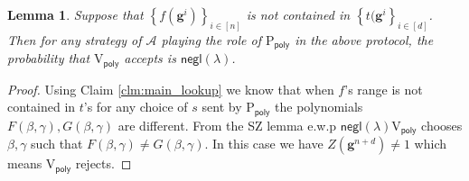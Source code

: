 \documentclass[11pt]{article} %
\newcommand{\adv}{\ensuremath{\mathcal A}\xspace}
\newcommand{\negl}{\ensuremath{\mathsf{negl}(\lambda)}\xspace}
\newcommand{\sett}[2]{\ensuremath{\set{#1}_{#2}}\xspace}
\newcommand{\prvpoly}{\ensuremath{\mathrm{P_{\mathsf{poly}}}}\xspace}
\newcommand{\verpoly}{\ensuremath{\mathrm{V_{\mathsf{poly}}}}\xspace}
\newcommand{\set}[1]{\ensuremath{\left\{#1\right\}}\xspace}
\newcommand{\hgen}{\ensuremath{\mathbf{g}}\xspace}
\newtheorem{lemma}{Lemma}[section]
\begin{document}
\begin{lemma}\label{lem:lookupprot}
 Suppose that $\sett{f(\hgen^i)}{i\in [n]}$ is not contained in  \sett{t(\hgen^i}{i\in [d]}.
 Then for any strategy of \adv playing the role of \prvpoly in the above protocol, the probability that
 \verpoly accepts is \negl.
\end{lemma}
\begin{proof}
 Using Claim \ref{clm:main_lookup} we know that when $f$'s range is not contained in $t$'s for any choice of $s$ sent by \prvpoly the polynomials $F(\beta,\gamma), G(\beta,\gamma)$ are different.
 From the SZ lemma e.w.p \negl \verpoly chooses $\beta,\gamma$ such that $F(\beta,\gamma)\neq G(\beta,\gamma)$. In this case we have $Z(\hgen^{n+d})\neq 1$ which means \verpoly rejects.
\end{proof}
\end{document}
